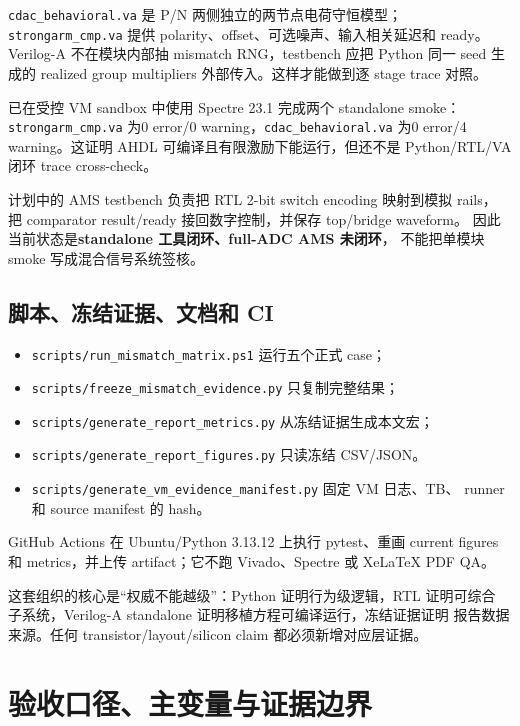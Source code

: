 \documentclass[UTF8,11pt,a4paper]{ctexart}
\newcommand{\code}[1]{\texttt{\small #1}}
\newcommand{\pathcode}[1]{{\small\nolinkurl{#1}}}
\newcommand{\keyterm}[1]{\textbf{\color{DeepNavy}#1}}
\begin{document}
\code{cdac\_behavioral.va} 是 P/N 两侧独立的两节点电荷守恒模型；
\code{strongarm\_cmp.va} 提供 polarity、offset、可选噪声、输入相关延迟和 ready。
Verilog-A 不在模块内部抽 mismatch RNG，testbench 应把 Python 同一 seed
生成的 realized group multipliers 外部传入。这样才能做到逐 stage trace 对照。

已在受控 VM sandbox 中使用 Spectre 23.1 完成两个 standalone smoke：
\code{strongarm\_cmp.va} 为0 error/0 warning，\code{cdac\_behavioral.va}
为0 error/4 warning。这证明 AHDL 可编译且有限激励下能运行，但还不是
Python/RTL/VA 闭环 trace cross-check。

计划中的 AMS testbench 负责把 RTL 2-bit switch encoding 映射到模拟 rails，
把 comparator result/ready 接回数字控制，并保存 top/bridge waveform。
因此当前状态是\keyterm{standalone 工具闭环、full-ADC AMS 未闭环}，
不能把单模块 smoke 写成混合信号系统签核。

\subsection{脚本、冻结证据、文档和 CI}

\begin{itemize}
  \item \pathcode{scripts/run_mismatch_matrix.ps1} 运行五个正式 case；
  \item \pathcode{scripts/freeze_mismatch_evidence.py} 只复制完整结果；
  \item \pathcode{scripts/generate_report_metrics.py} 从冻结证据生成本文宏；
  \item \pathcode{scripts/generate_report_figures.py} 只读冻结 CSV/JSON。
  \item \pathcode{scripts/generate_vm_evidence_manifest.py} 固定 VM 日志、TB、
    runner 和 source manifest 的 hash。
\end{itemize}
GitHub Actions 在 Ubuntu/Python 3.13.12 上执行 pytest、重画 current figures 和
metrics，并上传 artifact；它不跑 Vivado、Spectre 或 XeLaTeX PDF QA。

\begin{notebox}
  这套组织的核心是“权威不能越级”：Python 证明行为级逻辑，RTL 证明可综合
  子系统，Verilog-A standalone 证明移植方程可编译运行，冻结证据证明
  报告数据来源。任何
  transistor/layout/silicon claim 都必须新增对应层证据。
\end{notebox}

\section[验收口径与证据边界]{验收口径、主变量与证据边界}
\end{document}
